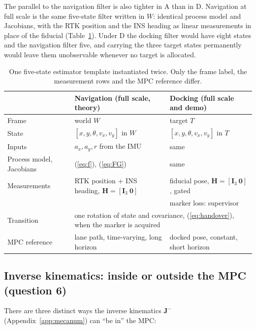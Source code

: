 \documentclass[11pt,a4paper]{article}
\newcommand{\mat}[1]{\bm{#1}}
\begin{document}
The parallel to the navigation filter is also tighter in A than in D. Navigation at full scale is the same five-state filter written in $W$: identical process model and Jacobians, with the RTK position and the INS heading as linear measurements in place of the fiducial (Table~\ref{tab:template}). Under D the docking filter would have eight states and the navigation filter five, and carrying the three target states permanently would leave them unobservable whenever no target is allocated.

\begin{table}[H]
\centering
\small
\renewcommand{\arraystretch}{1.2}
\setlength{\tabcolsep}{4pt}
\begin{tabular}{lll}
\toprule
 & Navigation (full scale, theory) & Docking (full scale and demo) \\
\midrule
Frame & world $W$ & target $T$ \\
State & $[x,y,\theta,v_x,v_y]$ in $W$ & $[x,y,\theta,v_x,v_y]$ in $T$ \\
Inputs & $a_x,a_y,r$ from the IMU & same \\
Process model, Jacobians & (\ref{eq:f}), (\ref{eq:FG}) & same \\
Measurements & RTK position + INS heading, $\mat H=[\mat I_3\ \mat 0]$ & fiducial pose, $\mat H=[\mat I_3\ \mat 0]$, gated \\
 & & marker loss: supervisor \\
Transition & \multicolumn{2}{l}{one rotation of state and covariance, (\ref{eq:handover}), when the marker is acquired} \\
MPC reference & lane path, time-varying, long horizon & docked pose, constant, short horizon \\
\bottomrule
\end{tabular}
\caption{One five-state estimator template instantiated twice. Only the frame label, the measurement rows and the MPC reference differ.}
\label{tab:template}
\end{table}

\subsection{Inverse kinematics: inside or outside the MPC (question 6)}
\label{sec:ik}

There are three distinct ways the inverse kinematics $\mat J^{-}$ (Appendix~\ref{app:mecanum}) can ``be in'' the MPC:
\end{document}
